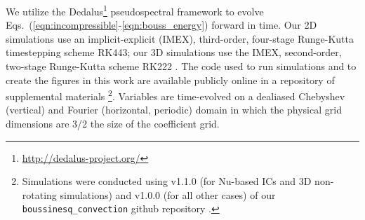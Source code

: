 \documentclass[aps, pre, onecolumn, nofootinbib, notitlepage, groupedaddress, amsfonts, amssymb, amsmath, longbibliography, superscriptaddress]{revtex4-1}
\newcommand{\ea}[1]{{\color{red} #1}}
\begin{document}
We utilize the Dedalus\footnote{\url{http://dedalus-project.org/}} pseudospectral framework \cite{burns&all2016, burns&all2019} to evolve Eqs.~(\ref{eqn:incompressible}-\ref{eqn:bouss_energy}) forward in time.
Our 2D simulations use an implicit-explicit (IMEX), third-order, four-stage Runge-Kutta timestepping scheme RK443; our 3D simulations use the \ea{IMEX}, second-order, two-stage Runge-Kutta scheme RK222 \cite{ascher&all1997}. 
The code used to run simulations and to create the figures in this work are available publicly online in a repository of supplemental materials \cite{anders&all2020a_supp}\footnote{Simulations were conducted using \ea{v1.1.0 (for Nu-based ICs and 3D non-rotating simulations) and} v1.0.0 \ea{(for all other cases)} of our \texttt{boussinesq\_convection} github repository \cite{code:boussinesq_convection}.}.
Variables are time-evolved on a dealiased Chebyshev (vertical) and Fourier (horizontal, periodic) domain in which the physical grid dimensions are 3/2 the size of the coefficient grid.  
\end{document}
